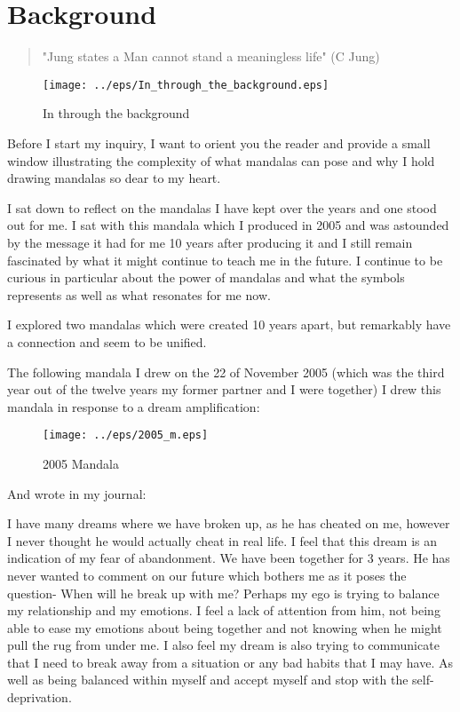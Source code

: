 \chapter{Background}
\begin{quote}
"Jung states a Man cannot stand a meaningless life" (C Jung) 
\end{quote}

\newpage
\begin{figure}[h!]
\begin{center}
\texttt{[image: ../eps/In\_through\_the\_background.eps]}
\caption{In through the background}
\label{label}
\end{center}
\end{figure}

\newpage
Before I start my inquiry, I want to orient you the reader and provide a small window illustrating the complexity of what mandalas can pose and why I hold drawing mandalas so dear to my heart. 

I sat down to reflect on the mandalas I have kept over the years and one stood out for me. I sat with this mandala which I produced in 2005 and was astounded by the message it had for me 10 years after producing it and I still remain fascinated by what it might continue to teach me in the future. I continue to be curious in particular about the power of mandalas and what the symbols represents as well as what resonates for me now. 

I explored two mandalas which were created 10 years apart, but remarkably have a connection and seem to be unified.   

The following mandala I drew on the 22 of November 2005 (which was the third year out of the twelve years my former partner and I were together) I drew this mandala in response to a dream amplification: 

\begin{figure}[h!] 
\begin{center}
\texttt{[image: ../eps/2005\_m.eps]}
\caption{2005 Mandala}
\label{label}
\end{center}
\end{figure}


And wrote in my journal: \newline 

I have many dreams where we have broken up, as he has cheated on me, however I never thought he would actually cheat in real life. I feel that this dream is an indication of my fear of abandonment. We have been together for 3 years. He has never wanted to comment on our future which bothers me as it poses the question- When will he break up with me? Perhaps my ego is trying to balance my relationship and my emotions. I feel a lack of attention from him, not being able to ease my emotions about being together and not knowing when he might pull the rug from under me. I also feel my dream is also trying to communicate that I need to break away from a situation or any bad habits that I may have. As well as being balanced within myself and accept myself and stop with the self-deprivation.  

